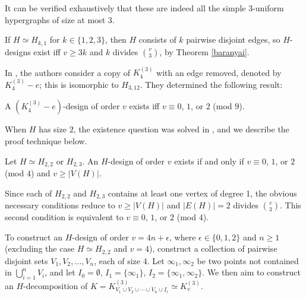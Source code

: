 It can be verified exhaustively that these are indeed all the simple $3$-uniform hypergraphs of size at most 3.

If $H \simeq H_{k,1}$ for $k \in \{1, 2, 3\}$, then $H$ consists of $k$ pairwise disjoint edges, so $H$-designs exist iff $v \geq 3k$ and $k$ divides ${v \choose 3}$, by Theorem \ref{baranyai}.

In \cite{feng-chang2}, the authors consider a copy of $K_4^{(3)}$ with an edge removed, denoted by $K_4^{(3)} - e$; this is isomorphic to $H_{3,12}$. They determined the following result:

\begin{theorem} \label{thm:H_3,12}
A $(K_4^{(3)}-e)$-design of order $v$ exists iff $v \equiv 0$, $1$, or $2$ (mod $9$).
\end{theorem}

When $H$ has size $2$, the existence question was solved in \cite{bryant}, and we describe the proof technique below.

\begin{theorem} \label{thm:H_22,H_23}
Let $H \simeq H_{2,2}$ or $H_{2,3}$.
An $H$-design of order $v$ exists if and only if $v \equiv 0$, $1$, or $2$ (mod $4$) and $v \geq |V(H)|$.
\end{theorem}

Since each of $H_{2,2}$ and $H_{2,3}$ contains at least one vertex of degree 1, the obvious necessary conditions
reduce to $v \geq |V(H)|$ and $|E(H)| = 2$ divides ${v \choose 3}$. This second condition is equivalent to $v \equiv 0$, $1$, or $2$ (mod $4$).

To construct an $H$-design of order $v = 4n + \epsilon$, where $\epsilon \in \{0,1,2\}$ and $n \geq 1$
(excluding the case $H \simeq H_{2,2}$ and $v = 4$), construct a collection of pairwise disjoint sets
$V_1, V_2, \ldots, V_n$, each of size 4. Let $\infty_1, \infty_2$ be two points not contained in
$\bigcup_{i=1}^{n} V_i$, and let $I_0 = \emptyset$, $I_1 = \{\infty_1\}$, $I_2 = \{\infty_1, \infty_2\}$.
We then aim to construct an $H$-decomposition of $K = K_{V_1 \cup V_2 \cup \cdots \cup V_n \cup I_\epsilon}^{(3)} \simeq K_{v}^{(3)}$.

